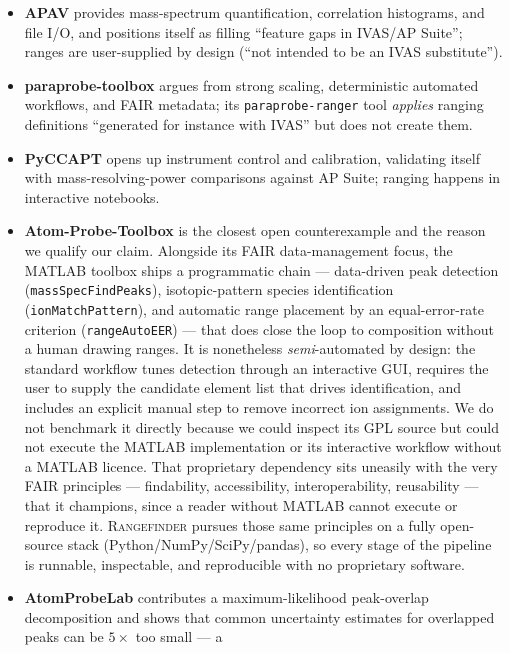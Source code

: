 \documentclass[11pt]{article}
\newcommand{\rf}{\textsc{Rangefinder}}
\begin{document}
\begin{itemize}
\item \textbf{APAV} \citep{smith2023apav} provides mass-spectrum
quantification, correlation histograms, and file I/O, and positions itself
as filling ``feature gaps in IVAS/AP Suite''; ranges are user-supplied
by design (``not intended to be an IVAS substitute'').
\item \textbf{paraprobe-toolbox} \citep{kuhbach2021,kuhbach2022} argues
from strong scaling, deterministic automated workflows, and FAIR metadata;
its \texttt{paraprobe-ranger} tool \emph{applies} ranging definitions
``generated for instance with IVAS'' but does not create them.
\item \textbf{PyCCAPT} \citep{monajem2025pyccapt} opens up instrument
control and calibration, validating itself with mass-resolving-power
comparisons against AP Suite; ranging happens in interactive notebooks.
\item \textbf{Atom-Probe-Toolbox} \citep{heller2024matlab,felfer_toolbox}
is the closest open counterexample and the reason we qualify our claim.
Alongside its FAIR data-management focus, the MATLAB toolbox ships a
programmatic chain --- data-driven peak detection
(\texttt{massSpecFindPeaks}), isotopic-pattern species identification
(\texttt{ionMatchPattern}), and automatic range placement by an
equal-error-rate criterion (\texttt{rangeAutoEER}) --- that does close the
loop to composition without a human drawing ranges. It is nonetheless
\emph{semi}-automated by design: the standard workflow tunes detection
through an interactive GUI, requires the user to supply the candidate
element list that drives identification, and includes an explicit manual
step to remove incorrect ion assignments. We do not benchmark it directly
because we could inspect its GPL source but could not execute the MATLAB
implementation or its interactive workflow without a MATLAB licence. That
proprietary dependency sits uneasily with the very FAIR
principles --- findability, accessibility, interoperability, reusability
\citep{wilkinson2016fair} --- that it champions, since a reader without
MATLAB cannot execute or reproduce it. \rf{} pursues those same principles
on a fully open-source stack (Python/NumPy/SciPy/pandas), so every stage of
the pipeline is runnable, inspectable, and reproducible with no proprietary
software.
\item \textbf{AtomProbeLab} \citep{london2019} contributes a
maximum-likelihood peak-overlap decomposition and shows that common
uncertainty estimates for overlapped peaks can be $5\times$ too small --- a

\end{itemize}
\end{document}
